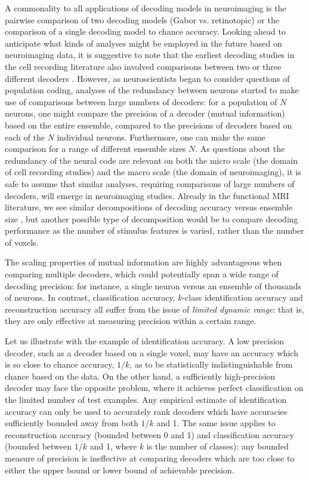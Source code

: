 \documentclass[12pt]{article}
\begin{document}
A commonality to all applications of decoding models in neuroimaging
is the pairwise comparison of two decoding models (Gabor
vs. retinotopic) or the comparison of a single decoding model to
chance accuracy.  Looking ahead to anticipate what kinds of analyses
might be employed in the future based on neuroimaging data, it is
suggestive to note that the earliest decoding studies in the cell
recording literature also involved comparisons between two or three
different decoders \cite{Eckhorn1976}.  However, as neuroscientists
began to consider questions of population coding, analyses of the
redundancy between neurons started to make use of comparisons between
large numbers of decoders: for a population of $N$ neurons, one might
compare the precision of a decoder (mutual information) based on the
entire ensemble, compared to the precisions of decoders based on each
of the $N$ individual neurons.  Furthermore, one can make the same
comparison for a range of different ensemble sizes $N$.  As questions
about the redundancy of the neural code are relevant on both the micro
scale (the domain of cell recording studies) and the macro scale (the
domain of neuroimaging), it is safe to assume that similar analyses,
requiring comparisons of large numbers of decoders, will emerge in
neuroimaging studies.  Already in the functional MRI literature, we
see similar decompositions of decoding accuracy versus ensemble
size \cite{Kay2008a}, but another possible type of decomposition would
be to compare decoding performance as the number of stimulus features
is varied, rather than the number of voxels.

The scaling properties of mutual information are highly advantageous
when comparing multiple decoders, which could potentially span a wide
range of decoding precision: for instance, a single neuron versus an
ensemble of thousands of neurons.  In contrast, classification
accuracy, $k$-class identification accuracy and reconstruction
accuracy all suffer from the issue of \emph{limited dynamic range}:
that is, they are only effective at measuring precision within a
certain range.

Let us illustrate with the example of identification accuracy.  A low
precision decoder, such as a decoder based on a single voxel, may have
an accuracy which is so close to chance accuracy, $1/k$, as to be
statistically indistinguishable from chance based on the data.  On the
other hand, a sufficiently high-precision decoder may face the
opposite problem, where it achieves perfect classification on the
limited number of test examples.  Any empirical estimate of
identification accuracy can only be used to accurately rank decoders
which have accuracies sufficiently bounded away from both $1/k$ and 1.
The same issue applies to reconstruction accuracy (bounded between 0
and 1) and classification accuracy (bounded between $1/k$ and 1, where
$k$ is the number of classes): any bounded measure of precision is
ineffective at comparing decoders which are too close to either the
upper bound or lower bound of achievable precision.
\end{document}

